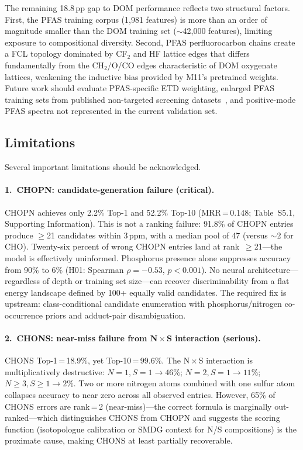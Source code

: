\documentclass[journal=jcisd8]{achemso}
\begin{document}
The remaining 18.8\,pp gap to DOM performance reflects two structural factors.
First, the PFAS training corpus (1,981 features) is more than an order of magnitude
smaller than the DOM training set ($\sim$42,000 features), limiting exposure to
compositional diversity.  Second, PFAS perfluorocarbon chains create a FCL topology
dominated by CF$_2$ and HF lattice edges that differs fundamentally from the
CH$_2$/O/CO edges characteristic of DOM oxygenate lattices, weakening the inductive
bias provided by M11's pretrained weights.  Future work should evaluate
PFAS-specific ETD weighting, enlarged PFAS training sets from published non-targeted
screening datasets~\cite{Aron2020}, and positive-mode PFAS spectra not represented
in the current validation set.

\subsection{Limitations}

Several important limitations should be acknowledged.

\paragraph{1.\ CHOPN: candidate-generation failure (critical).}
CHOPN achieves only 2.2\% Top-1 and 52.2\% Top-10 (MRR\,=\,0.148;
Table~S5.1, Supporting Information).
This is not a ranking failure: 91.8\% of CHOPN entries produce $\ge$21 candidates
within 3\,ppm, with a median pool of 47 (versus $\sim$2 for CHO).
Twenty-six percent of wrong CHOPN entries land at rank~$\ge$21---the model is
effectively uninformed.
Phosphorus presence alone suppresses accuracy from 90\% to 6\%
(H01: Spearman $\rho=-0.53$, $p<0.001$).
No neural architecture---regardless of depth or training set size---can recover
discriminability from a flat energy landscape defined by 100+ equally valid candidates.
The required fix is upstream: class-conditional candidate enumeration with
phosphorus/nitrogen co-occurrence priors and adduct-pair disambiguation.

\paragraph{2.\ CHONS: near-miss failure from N\,$\times$\,S interaction (serious).}
CHONS Top-1\,=\,18.9\%, yet Top-10\,=\,99.6\%.
The N\,$\times$\,S interaction is multiplicatively destructive:
$N=1, S=1 \to 46\%$; $N=2, S=1 \to 11\%$; $N\ge 3, S\ge 1 \to 2\%$.
Two or more nitrogen atoms combined with one sulfur atom collapses accuracy to near
zero across all observed entries.
However, 65\% of CHONS errors are rank\,=\,2 (near-miss)---the correct formula
is marginally out-ranked---which distinguishes CHONS from CHOPN and suggests the
scoring function (isotopologue calibration or SMDG context for N/S compositions)
is the proximate cause, making CHONS at least partially recoverable.
\end{document}
